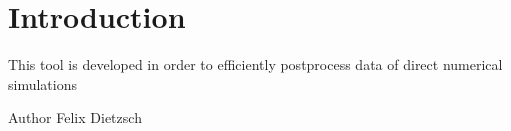 \hypertarget{index_Introduction}{}\section{Introduction}\label{index_Introduction}
This tool is developed in order to efficiently postprocess data of direct numerical simulations

\begin{DoxyAuthor}{Author}
Felix Dietzsch 
\end{DoxyAuthor}
